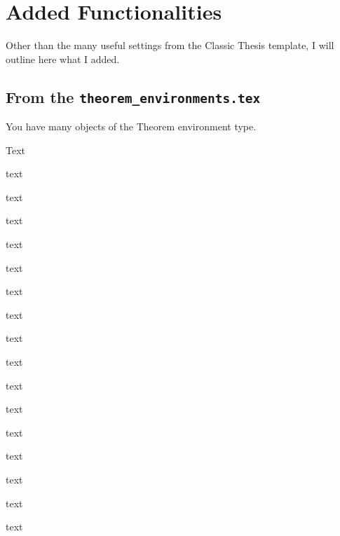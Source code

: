 \section{Added Functionalities}
\par Other than the many useful settings from the Classic Thesis template, I will outline here what I added. 
\subsection{From the \texttt{theorem\_environments.tex}}
You have many objects of the Theorem environment type. 
\begin{theorem}[Title]\label{thm:firsttheorem}
    Text
\end{theorem}
\begin{example}
    text
\end{example}
\begin{definition}
    text
\end{definition}
\begin{lemma}
    text
\end{lemma}
\begin{conjecture}
    text
\end{conjecture}
\begin{proposition}
    text
\end{proposition}
\begin{corollary}
    text
\end{corollary}
\begin{assumption}
    text
\end{assumption}
\begin{result}
    text
\end{result}
\begin{condition}
    text
\end{condition}
\begin{question}
    text
\end{question}
\begin{answer}
    text
\end{answer}

\begin{problem}
    text
\end{problem}
\begin{fact}
    text
\end{fact}
\begin{remark}
    text
\end{remark}
\begin{observation}
    text
\end{observation}
\begin{claim}
    text
\end{claim}
